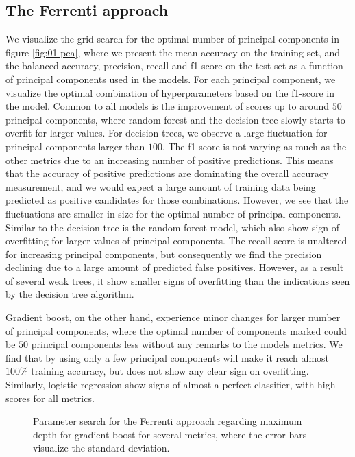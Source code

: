 \subsection{The Ferrenti approach}

We visualize the grid search for the optimal number of principal components in figure \ref{fig:01-pca}, where we present the mean accuracy on the training set, and the balanced accuracy, precision, recall and f1 score on the test set as a function of principal components used in the models. For each principal component, we visualize the optimal combination of hyperparameters based on the f1-score in the model. Common to all models is the improvement of scores up to around $50$ principal components, where random forest and the decision tree slowly starts to overfit for larger values. For decision trees, we observe a large fluctuation for principal components larger than $100$. The f1-score is not varying as much as the other metrics due to an increasing number of positive predictions. This means that the accuracy of positive predictions are dominating the overall accuracy measurement, and we would expect a large amount of training data being predicted as positive candidates for those combinations. However, we see that the fluctuations are smaller in size for the optimal number of principal components. Similar to the decision tree is the random forest model, which also show sign of overfitting for larger values of principal components. The recall score is unaltered for increasing principal components, but consequently we find the precision declining due to a large amount of predicted false positives.  However, as a result of several weak trees, it show smaller signs of overfitting than the indications seen by the decision tree algorithm.

Gradient boost, on the other hand, experience minor changes for larger number of principal components, where the optimal number of components marked could be $50$ principal components less without any remarks to the models metrics. We find that by using only a few principal components will make it reach almost $100\%$ training accuracy, but does not show any clear sign on overfitting. Similarly, logistic regression show signs of almost a perfect classifier, with high scores for all metrics.

\begin{wrapfigure}{R}{0.5\textwidth}

  \begin{subfigure}[b]{1.0\textwidth}
  
  \end{subfigure}

  \begin{subfigure}[b]{1.0\textwidth}
  
  \end{subfigure}
  \vspace*{-130mm}
  \caption{Parameter search for the Ferrenti approach regarding maximum depth for gradient boost for several metrics, where the error bars visualize the standard deviation.}
  \label{fig:gb-01-overfit}
\end{wrapfigure}


